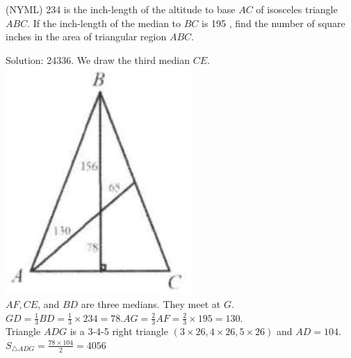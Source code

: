 \documentclass{article}
\begin{document}
(NYML) 234 is the inch-length of the altitude to base \(A C\) of isosceles triangle \(A B C\). If the inch-length of the median to \(B C\) is 195 , find the number of square inches in the area of triangular region \(A B C\).

Solution: 24336.
We draw the third median \(C E\).\\
\centering
\includegraphics[width=\textwidth]{images/010(1).jpg}\\
\(A F, C E\), and \(B D\) are three medians. They meet at \(G\).\\
\(G D=\frac{1}{3} B D=\frac{1}{3} \times 234=78 . A G=\frac{2}{3} A F=\frac{2}{3} \times 195=130\).\\
Triangle \(A D G\) is a 3-4-5 right triangle \((3 \times 26,4 \times 26,5 \times 26)\) and \(A D=104\).\\
\(S_{\triangle A D G}=\frac{78 \times 104}{2}=4056\)\\
\centering
\end{document}
